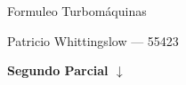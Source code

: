 \documentclass{article}
\begin{document}
\pagestyle{empty}
{
\centering
{\large Formuleo Turbomáquinas \par}

{\small Patricio Whittingslow --- 55423\par}
}
\fontsize{10}{0}
\newcommand{\formuleoseparator}{}


{ \centering
{\bf \Huge \sc Segundo Parcial $\downarrow$} 
}

\end{document}

